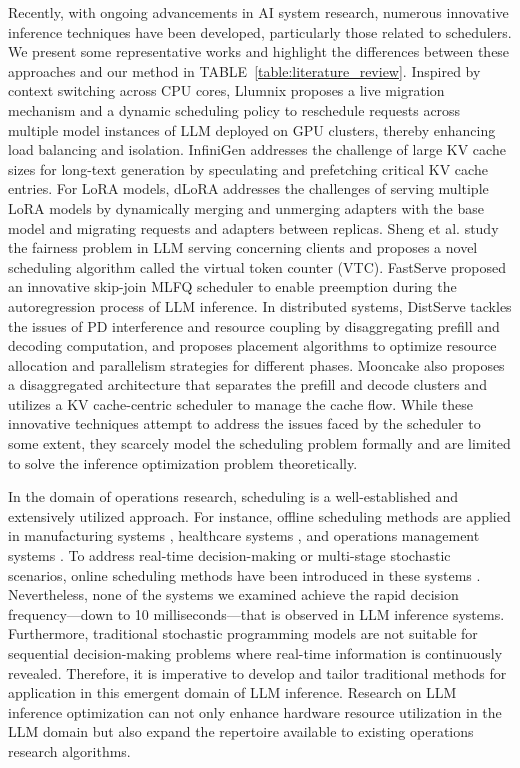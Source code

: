 Recently, with ongoing advancements in AI system research, numerous innovative inference techniques have been developed, particularly those related to schedulers. We present some representative works and highlight the differences between these approaches and our method in TABLE~\ref{table:literature_review}. Inspired by context switching across CPU cores, Llumnix \cite{sun2024llumnix} proposes a live migration mechanism and a dynamic scheduling policy to reschedule requests across multiple model instances of LLM deployed on GPU clusters, thereby enhancing load balancing and isolation. InfiniGen \cite{lee2024infinigen} addresses the challenge of large KV cache sizes for long-text generation by speculating and prefetching critical KV cache entries. For LoRA models, dLoRA \cite{wu2024dlora} addresses the challenges of serving multiple LoRA models by dynamically merging and unmerging adapters with the base model and migrating requests and adapters between replicas. Sheng et al. \cite{sheng2024fairness} study the fairness problem in LLM serving concerning clients and proposes a novel scheduling algorithm called the virtual token counter (VTC). FastServe \cite{wu2023fast} proposed an innovative skip-join MLFQ scheduler to enable preemption during the autoregression process of LLM inference. In distributed systems, DistServe \cite{zhong2024distserve} tackles the issues of PD interference and resource coupling by disaggregating prefill and decoding computation, and proposes placement algorithms to optimize resource allocation and parallelism strategies for different phases. Mooncake \cite{qin2024mooncake} also proposes a disaggregated architecture that separates the prefill and decode clusters and utilizes a KV cache-centric scheduler to manage the cache flow. While these innovative techniques attempt to address the issues faced by the scheduler to some extent, they scarcely model the scheduling problem formally and are limited to solve the inference optimization problem theoretically.


In the domain of operations research, scheduling is a well-established and extensively utilized approach. For instance, offline scheduling methods are applied in manufacturing systems \cite{wang2020print3D}, healthcare systems \cite{pang2018surgery}, and operations management systems \cite{erdogan2015online}. To address real-time decision-making or multi-stage stochastic scenarios, online scheduling methods have been introduced in these systems \cite{pang2022dynamic, lee2019online}. Nevertheless, none of the systems we examined achieve the rapid decision frequency—down to 10 milliseconds—that is observed in LLM inference systems. Furthermore, traditional stochastic programming models are not suitable for sequential decision-making problems where real-time information is continuously revealed. Therefore, it is imperative to develop and tailor traditional methods for application in this emergent domain of LLM inference. Research on LLM inference optimization can not only enhance hardware resource utilization in the LLM domain but also expand the repertoire available to existing operations research algorithms.



